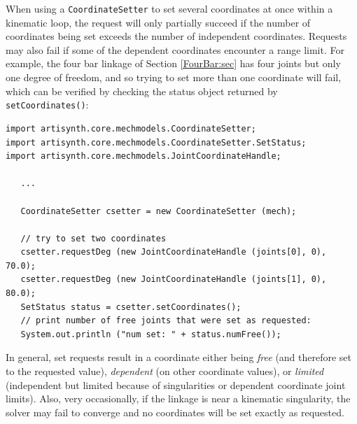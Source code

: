 When using a {\tt CoordinateSetter} to set several coordinates at once within a
kinematic loop, the request will only partially succeed if the number of
coordinates being set exceeds the number of independent coordinates. Requests
may also fail if some of the dependent coordinates encounter a range limit. For
example, the four bar linkage of Section \ref{FourBar:sec} has four joints but
only one degree of freedom, and so trying to set more than one coordinate will
fail, which can be verified by checking the status object returned by {\tt
setCoordinates()}:
%
\begin{lstlisting}[]
import artisynth.core.mechmodels.CoordinateSetter;
import artisynth.core.mechmodels.CoordinateSetter.SetStatus;
import artisynth.core.mechmodels.JointCoordinateHandle;

   ...

   CoordinateSetter csetter = new CoordinateSetter (mech);

   // try to set two coordinates
   csetter.requestDeg (new JointCoordinateHandle (joints[0], 0), 70.0);
   csetter.requestDeg (new JointCoordinateHandle (joints[1], 0), 80.0);
   SetStatus status = csetter.setCoordinates();
   // print number of free joints that were set as requested:
   System.out.println ("num set: " + status.numFree());
\end{lstlisting}
%
In general, set requests result in a coordinate either being {\it free} (and
therefore set to the requested value), {\it dependent} (on other coordinate
values), or {\it limited} (independent but limited because of singularities or
dependent coordinate joint limits). Also, very occasionally, if the linkage is
near a kinematic singularity, the solver may fail to converge and no
coordinates will be set exactly as requested.

